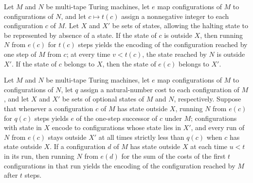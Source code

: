 \begin{definition}
\label{Turing.Lockstep}
\leanok
{}
Let $M$ and $N$ be multi-tape Turing machines, let $e$ map configurations of $M$ to
configurations of $N$, and let $c\mapsto t(c)$ assign a nonnegative integer to each
configuration $c$ of $M$. Let $X$ and $X'$ be sets of states, allowing the halting state
to be represented by absence of a state. If the state of $c$ is outside $X$, then
running $N$ from $e(c)$ for $t(c)$ steps yields the encoding of the configuration
reached by one step of $M$ from $c$; at every time $v<t(c)$, the state reached by $N$ is
outside $X'$. If the state of $c$ belongs to $X$, then the state of $e(c)$ belongs to
$X'$.
\end{definition}

\begin{theorem}
\label{Turing.Lockstep.runFrom}
\leanok
{}
Let $M$ and $N$ be multi-tape Turing machines, let $e$ map configurations of $M$ to
configurations of $N$, let $q$ assign a natural-number cost to each configuration of
$M$, and let $X$ and $X'$ be sets of optional states of $M$ and $N$, respectively.
Suppose that whenever a configuration $c$ of $M$ has state outside $X$, running $N$ from
$e(c)$ for $q(c)$ steps yields $e$ of the one-step successor of $c$ under $M$;
configurations with state in $X$ encode to configurations whose state lies in $X'$, and
every run of $N$ from $e(c)$ stays outside $X'$ at all times strictly less than $q(c)$
when $c$ has state outside $X$. If a configuration $d$ of $M$ has state outside $X$ at
each time $u<t$ in its run, then running $N$ from $e(d)$ for the sum of the costs of the
first $t$ configurations in that run yields the encoding of the configuration reached by
$M$ after $t$ steps.
\end{theorem}

